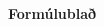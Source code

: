 \documentclass[12pt,a4paper,landscape]{article}
\begin{document}
\begin{multicols}{3}

%
%
\end{multicols}

\clearpage

\begin{center}
     \Large{\textbf{Formúlublað}} \\
\end{center}
\end{document}
